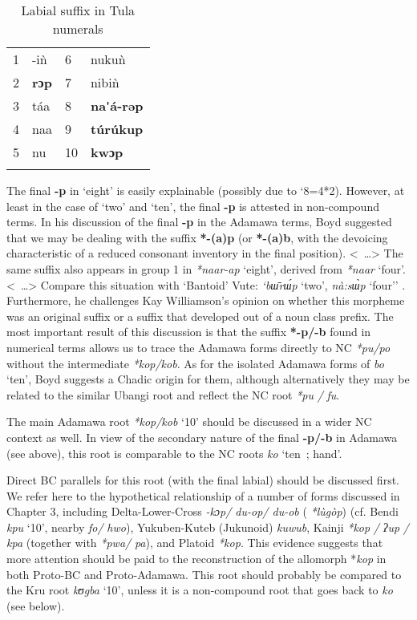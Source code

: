 \begin{table}
\caption{\label{tab:4:39}Labial suffix in Tula numerals}


\begin{tabularx}{\textwidth}{XXXX}
\lsptoprule

1 & -i{\`{n}} & 6 & nuku{\`{n}}\\
2 & \textbf{rɔp} & 7 & nibi{\`{n}}\\
3 & táa & 8 & \textbf{na}\textbf{\'{}á-rəp}\\
4 & naa & 9 &  \textbf{t{\'{u}}}\textbf{r{\'{u}}}\textbf{kup}\\
5 & nu & 10 & \textbf{kwɔp}\\
\lspbottomrule
\end{tabularx}
\end{table}
The final \textbf{-p} in ‘eight’ is easily explainable (possibly due to ‘8=4*2). However, at least in the case of ‘two’ and ‘ten’, the final \textbf{-p} is attested in non-compound terms. In his discussion of the final \textbf{-p} in the Adamawa terms, Boyd suggested that we may be dealing with the suffix \textbf{*-(a}\textbf{)p} (or \textbf{*-(a}\textbf{)b}, with the devoicing characteristic of a reduced consonant inventory in the final position). <~…> The same suffix also appears in group 1 in \textit{*naar-ap} ‘eight’, derived from \textit{*naar} ‘four’. <~…> Compare this situation with ‘Bantoid’ Vute: \textit{‘b{\={ɯ}}r{\'{ɯ}}p} ‘two’, \textit{nà:s{\`{ɯ}}p} ‘four’’ \citep[156]{Boyd1989}. Furthermore, he challenges Kay Williamson’s opinion on whether this morpheme was an original suffix or a suffix that developed out of a noun class prefix. The most important result of this discussion is that the suffix \textbf{*-p}\textbf{/-b} found in numerical terms allows us to trace the Adamawa forms directly to NC \textit{*pu/po} without the intermediate \textit{*kop/kob}. As for the isolated Adamawa forms of \textit{bo} ‘ten’, Boyd suggests a Chadic origin for them, although alternatively they may be related to the similar Ubangi root and reflect the NC root \textit{*pu} \textit{/} \textit{fu}.

The main Adamawa root \textit{*kop/kob} ‘10’ should be discussed in a wider NC context as well. In view of the secondary nature of the final \textbf{-p/-b} in Adamawa (see above), this root is comparable to the NC roots \textit{ko} ‘ten~; hand’.

Direct BC parallels for this root (with the final labial) should be discussed first. We refer here to the hypothetical relationship of a number of forms discussed in Chapter 3, including Delta-Lower-Cross \textit{-kɔp/ du-op/ du-ob} (\citealt{Dimmendaal1978} \textit{*l{\`{u}}gòp}) (cf. Bendi \textit{kpu} ‘10’, nearby \textit{fo/} \textit{hwo}), Yukuben-Kuteb (Jukunoid) \textit{kuwub}, Kainji \textit{*kop} \textit{/} \textit{ʔup} \textit{/} \textit{kpa} (together with \textit{*pwa/} \textit{pa}), and Platoid \textit{*kop}. This evidence suggests that more attention should be paid to the reconstruction of the allomorph *\textit{kop} in both Proto-BC and Proto-Adamawa. This root should probably be compared to the Kru root \textit{kʊgba} ‘10’, unless it is a non-compound root that goes back to \textit{ko} (see below).

